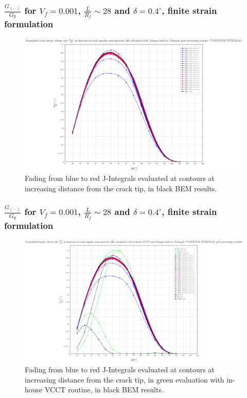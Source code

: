 \documentclass[first,firstsupp,lastsupp,handout,last,hyperref,table]{ETHclass}
\begin{document}
\begin{frame}
\frametitle{\small $\frac{G_{\left(\cdot\cdot\right)}}{G_{0}}$ for $V_{f}=0.001$, $\frac{L}{R_{f}}\sim28$ and $\delta=0.4^{\circ}$, finite strain formulation}
\vspace{-0.5cm}
\centering
\captionsetup[figure]{font=scriptsize,labelfont=scriptsize}
\begin{figure}[!h]
\centering
\includegraphics[height=0.7\textheight]{2017-06-23_AbqRunSummary_SingleFiberEqRfFiniteStrain_J-INT_Summary.pdf}
  \caption{\scriptsize Fading from blue to red J-Integrals evaluated at contours at increasing distance from the crack tip, in black BEM results.}
  \label{fig:res1}
\end{figure}
\end{frame}

\begin{frame}
\frametitle{\small $\frac{G_{\left(\cdot\cdot\right)}}{G_{0}}$ for $V_{f}=0.001$, $\frac{L}{R_{f}}\sim28$ and $\delta=0.4^{\circ}$, finite strain formulation}
\vspace{-0.5cm}
\centering
\captionsetup[figure]{font=scriptsize,labelfont=scriptsize}
\begin{figure}[!h]
\centering
\includegraphics[height=0.7\textheight]{2017-06-23_AbqRunSummary_SingleFiberEqRfFiniteStrain_VCCT-JINT_Summary.pdf}
  \caption{\scriptsize Fading from blue to red J-Integrals evaluated at contours at increasing distance from the crack tip, in green evaluation with in-house VCCT routine, in black BEM results.}
  \label{fig:res1}
\end{figure}
\end{frame}
\end{document}
